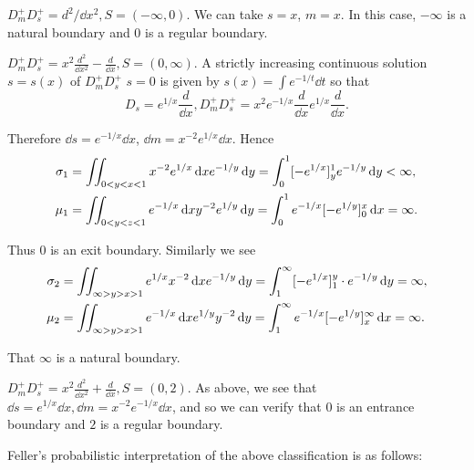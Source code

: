 \begin{example}\label{ex:XIII.6.Example.2} $D_{m}^{+}D_{s}^{+} = d^{2} / \dd x^{2}, S = (-\infty,0)$. We can take $s = x$, $m = x$. In this case, $-\infty$ is a natural boundary and $0$ is a regular boundary. 
\end{example}

\begin{example}\label{ex:XIII.6.Example.3} $D_{m}^{+}D_{s}^{+} = x^{2}\frac{d^{2}}{\dd x^{2}} -\frac{d}{\dd x}, S = (0,\infty)$. A strictly increasing continuous solution $s = s(x)$ of $D_{m}^{+}D_{s}^{+}$ $s = 0$ is given by $s(x) = \int e^{-1/t}\dd t$ so that 
\[
D _{s} = e ^{1/x} \frac {d}{\dd x}, D _{m} ^{+} D _{s} ^{+} = x ^{2} e ^{-1/x} \frac {d}{\dd x} e ^{1/x} \frac {d}{\dd x}.
\]
\end{example}

Therefore $\dd s = e^{-1/x} \dd x$, $\dd m = x^{-2} e^{1/x} \dd x$. Hence 
\begin{align}
\sigma_{1}& = \iint_{0<y<x<1} x ^{-2} e ^{1/x} \mathop{}\!\mathrm{d} x e ^{-1/y} \mathop{}\!\mathrm{d} y = \int_{0} ^{1} [ - e ^{1/x} ] _{y} ^{1} e ^{-1/y} \mathop{}\!\mathrm{d} y < \infty , \notag \\
\mu_{1}& = \iint_{0<y<z<1} e ^{-1/x} \mathop{}\!\mathrm{d} x y ^{-2} e ^{1/y} \mathop{}\!\mathrm{d} y = \int_{0} ^{1} e ^{-1/x} [ - e ^{1/y} ] _{0} ^{x} \mathop{}\!\mathrm{d} x = \infty . \notag
\end{align}

Thus $0$ is an exit boundary. Similarly we see 
\begin{align}
\sigma_{2}& = \iint_{\infty > y > x > 1} e ^{1/x} x ^{-2} \mathop{}\!\mathrm{d} x e ^{-1/y} \mathop{}\!\mathrm{d} y = \int_{1} ^{\infty} [ - e ^{1/x} ] _{1} ^{y} \cdot e ^{-1/y} \mathop{}\!\mathrm{d} y = \infty , \notag \\
\mu_{2}& = \iint_{\infty > y > x > 1} e ^{-1/x} \mathop{}\!\mathrm{d} x e ^{1/y} y ^{-2} \mathop{}\!\mathrm{d} y = \int_{1} ^{\infty} e ^{-1/x} [ - e ^{1/y} ] _{x} ^{\infty} \mathop{}\!\mathrm{d} x = \infty . \notag
\end{align}

That $\infty$ is a natural boundary. 

\begin{example}\label{ex:XIII.6.Example.4} $D_{m}^{+}D_{s}^{+} = x^{2}\frac{d^{2}}{\dd x^{2}} +\frac{d}{\dd x}, S = (0,2)$. As above, we see that $\dd s = e^{1/x}\dd x, \dd m = x^{-2}e^{-1/x}\dd x$, and so we can verify that $0$ is an entrance boundary and $2$ is a regular boundary. 
\end{example}

Feller's probabilistic interpretation of the above classification is as follows: 

